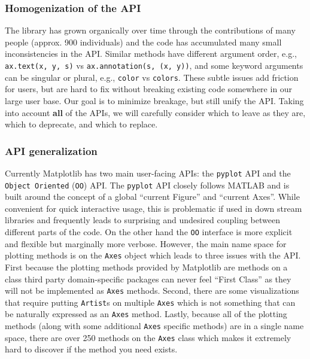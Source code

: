 \documentclass[11pt]{article}  %
\begin{document}

\subsubsection{Homogenization of the API}

The library has grown organically over time through the contributions
of many people (approx. 900 individuals) and the code has accumulated
many small inconsistencies in the API.  Similar methods have different
argument order, e.g., \texttt{ax.text(x, y, s)} vs
\texttt{ax.annotation(s, (x, y))}, and some keyword arguments can be
singular or plural, e.g., \texttt{color} vs \texttt{colors}.  These
subtle issues add friction for users, but are hard to fix without
breaking existing code somewhere in our large user base.  Our goal is
to minimize breakage, but still unify the API.  Taking into account
\textbf{all} of the APIs, we will carefully consider which to leave as
they are, which to deprecate, and which to replace.

\subsubsection{API generalization}

Currently Matplotlib has two main user-facing APIs: the
\texttt{pyplot} API and the \texttt{Object Oriented} (\texttt{OO})
API.
The \texttt{pyplot} API closely follows MATLAB and is built around the concept
of a global ``current Figure'' and ``current Axes''.
While
convenient for quick interactive usage, this is
problematic if used in down stream libraries and frequently leads to surprising
and undesired coupling between different parts of the code.
On the other hand the \texttt{OO} interface is more explicit and
flexible but marginally more verbose.
  However, the main name space
for plotting methods is on the \texttt{Axes} object which leads to
three issues with the API.
  First because the plotting methods
provided by Matplotlib are methods on a class third party
domain-specific packages can never feel ``First Class'' as they will
not be implemented as \texttt{Axes} methods.
  Second, there are some
visualizations that require putting \texttt{Artist}s on
multiple \texttt{Axes} which is not something that can be naturally
expressed as an \texttt{Axes} method.
Lastly, because all of the
plotting methods (along with some additional \texttt{Axes} specific
methods) are in a single name space, there are over 250 methods on the
\texttt{Axes} class which makes it extremely hard to discover if the
method you need exists.
\end{document}

